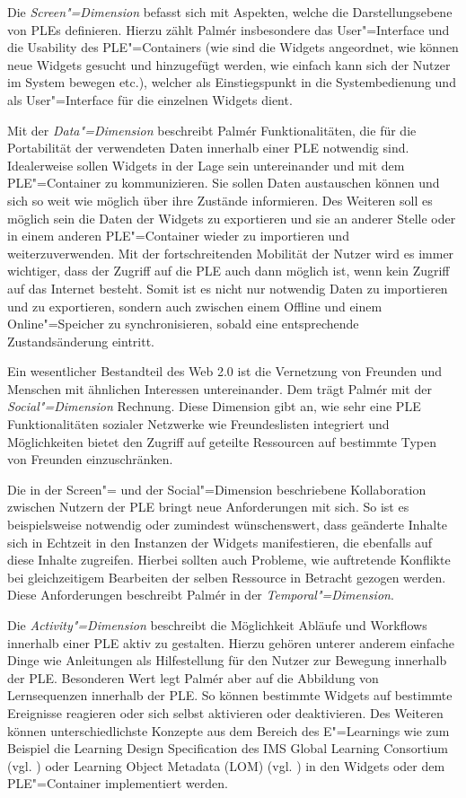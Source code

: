 Die \emph{Screen"=Dimension} befasst sich mit Aspekten, welche die Darstellungsebene von PLEs definieren. Hierzu zählt Palmér insbesondere das User"=Interface und die Usability des PLE"=Containers (wie sind die Widgets angeordnet, wie können neue Widgets gesucht und hinzugefügt werden, wie einfach kann sich der Nutzer im System bewegen etc.), welcher als Einstiegspunkt in die Systembedienung und als User"=Interface für die einzelnen Widgets dient.

Mit der \emph{Data"=Dimension} beschreibt Palmér Funktionalitäten, die für die Portabilität der verwendeten Daten innerhalb einer PLE notwendig sind. Idealerweise sollen Widgets in der Lage sein untereinander und mit dem PLE"=Container zu kommunizieren. Sie sollen Daten austauschen können und sich so weit wie möglich über ihre Zustände informieren. Des Weiteren soll es möglich sein die Daten der Widgets zu exportieren und sie an anderer Stelle oder in einem anderen PLE"=Container wieder zu importieren und weiterzuverwenden. Mit der fortschreitenden Mobilität der Nutzer wird es immer wichtiger, dass der Zugriff auf die PLE auch dann möglich ist, wenn kein Zugriff auf das Internet besteht. Somit ist es nicht nur notwendig Daten zu importieren und zu exportieren, sondern auch zwischen einem Offline und einem Online"=Speicher zu synchronisieren, sobald eine entsprechende Zustandsänderung eintritt.

Ein wesentlicher Bestandteil des Web 2.0 ist die Vernetzung von Freunden und Menschen mit ähnlichen Interessen untereinander. Dem trägt Palmér mit der \emph{Social"=Dimension} Rechnung. Diese Dimension gibt an, wie sehr eine PLE Funktionalitäten sozialer Netzwerke wie Freundeslisten integriert und Möglichkeiten bietet den Zugriff auf geteilte Ressourcen auf bestimmte Typen von Freunden einzuschränken.

Die in der Screen"= und der Social"=Dimension beschriebene Kollaboration zwischen Nutzern der PLE bringt neue Anforderungen mit sich. So ist es beispielsweise notwendig oder zumindest wünschenswert, dass geänderte Inhalte sich in Echtzeit in den Instanzen der Widgets manifestieren, die ebenfalls auf diese Inhalte zugreifen. Hierbei sollten auch Probleme, wie auftretende Konflikte bei gleichzeitigem Bearbeiten der selben Ressource in Betracht gezogen werden. Diese Anforderungen beschreibt Palmér in der \emph{Temporal"=Dimension}.

Die \emph{Activity"=Dimension} beschreibt die Möglichkeit Abläufe und Workflows innerhalb einer PLE aktiv zu gestalten. Hierzu gehören unterer anderem einfache Dinge wie Anleitungen als Hilfestellung für den Nutzer zur Bewegung innerhalb der PLE. Besonderen Wert legt Palmér aber auf die Abbildung von Lernsequenzen innerhalb der PLE. So können bestimmte Widgets auf bestimmte Ereignisse reagieren oder sich selbst aktivieren oder deaktivieren. Des Weiteren können unterschiedlichste Konzepte aus dem Bereich des E"=Learnings wie zum Beispiel die Learning Design Specification des IMS Global Learning Consortium (vgl. \cite{IMS2012}) oder Learning Object Metadata (LOM) (vgl. \cite{LOM2002}) in den Widgets oder dem PLE"=Container implementiert werden.

